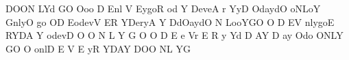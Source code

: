 \thispagestyle{empty}
\clearpage
\begin{center}
    \thispagestyle{empty}
    \vspace*{\fill}
    \begin{verbbox}
               DOON
             LYd   GO
            Ooo      D
           Enl       V
          EygoR    od Y
          DeveA   r YyD
          OdaydO  oNLoY
           GnlyO   go  OD
           EodevV      ER
           YDeryA       Y
          DdOaydO       N
          LooYGO  O    D
        EV  nlygoE RYDA
       Y     odevD
      O           O
      N           L
     Y            G
     O            O
   D             E
e  Vr       E    R
y  Yd D    AY    D
ay Odo ONLY GO    O
 onlD  E   V  E  yR
     YDAY  DOO NL YG
    \end{verbbox}
    \centering\theverbbox
    \vspace*{\fill}
\end{center}
\clearpage
